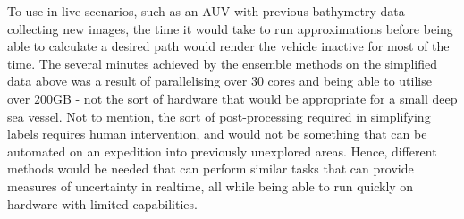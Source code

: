 To use in live scenarios, such as an AUV with previous bathymetry data collecting new images, the time it would take to run approximations before being able to calculate a desired path would render the vehicle inactive for most of the time. The several minutes achieved by the ensemble methods on the simplified data above was a result of parallelising over $30$ cores and being able to utilise over $200$GB - not the sort of hardware that would be appropriate for a small deep sea vessel. Not to mention, the sort of post-processing required in simplifying labels requires human intervention, and would not be something that can be automated on an expedition into previously unexplored areas. Hence, different methods would be needed that can perform similar tasks that can provide measures of uncertainty in realtime, all while being able to run quickly on hardware with limited capabilities.

